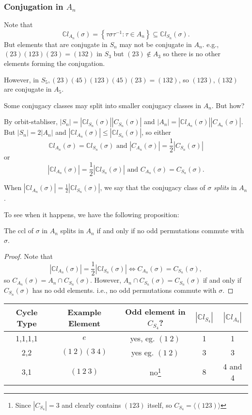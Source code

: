 \documentclass[a4paper]{article}
\begin{document}
\subsubsection{Conjugation in $A_n$}

Note that
\[
  \mathbb{C}l_{A_n}(\sigma)=\left\{ \tau \sigma\tau^{-1}:\tau\in A_n
  \right\} \subseteq \mathbb{C}l_{S_n}(\sigma)
.\]
But elements that are conjugate in $S_n$ may not be conjugate in
$A_n$. e.g., $ (23)(123)(23)=(132) $ in $S_3$ but $ (23)\notin A_3 $
so there is no other elements forming the conjugation.

However, in $S_5, (23)(45)(123)(45)(23)=(132)$, so $ (123),(132) $
are conjugate in $A_5$.

Some conjugacy classes may split into smaller conjugacy classes in
$A_n$. But how?

By orbit-stabliser, $
|S_n|=|\mathbb{C}l_{S_n}(\sigma)||C_{S_n}(\sigma)| $ and $
|A_n|=|\mathbb{C}l_{A_n}(\sigma)||C_{A_n}(\sigma)| $. But $
|S_n|=2|A_n| $ and $ |\mathbb{C}l_{A_n}(\sigma)|\le
|\mathbb{C}l_{S_n}(\sigma)| $, so either
\[
  \mathbb{C}l_{A_n}(\sigma)=\mathbb{C}l_{S_n}(\sigma) \text{ and }
  |C_{A_n}(\sigma)|=\frac{1}{2}|C_{S_n}(\sigma)|
\]
or
\[
  |\mathbb{C}l_{A_n}(\sigma)|=\frac{1}{2}
  |\mathbb{C}l_{S_n}(\sigma)|\text{ and } C_{A_n}(\sigma)=C_{S_n}(\sigma)
.\]
\begin{definition}
  When $|\mathbb{C}l_{A_n}(\sigma)|=\frac{1}{2}
  |\mathbb{C}l_{S_n}(\sigma)|$, we say that the conjugacy class of $
  \sigma $ \textit{splits} in $A_n$.
\end{definition}
To see when it happens, we have the following proposition:
\begin{proposition}\label{prop:5.28}
  The ccl of $ \sigma $ in $A_n$ splits in $A_n$ if and only if no
  odd permutations commute with $\sigma$.
\end{proposition}
\begin{proof}
  Note that
  \[
    |\mathbb{C}l_{A_n}(\sigma)|=\frac{1}{2}
    |\mathbb{C}l_{S_n}(\sigma)| \Longleftrightarrow
    C_{A_n}(\sigma)=C_{S_n}(\sigma)
  ,\]
  so $ C_{A_n}(\sigma)=A_n \cap C_{S_n}(\sigma) $. However, $ A_n
  \cap C_{S_n}(\sigma) =C_{S_n}(\sigma) $ if and only if
  $C_{S_n}(\sigma)$ has no odd elements. i.e., no odd permutations
  commute with $ \sigma $.
\end{proof}
\begin{example}
  \begin{center}
    \begin{tabular}{c|c|c|c|c}
      Cycle Type & Example Element & Odd element in $C_{S_4}$? &
      $|\mathbb{C}l_{S_4}|$ & $|\mathbb{C}l_{A_4}|$ \\
      \hline
      1,1,1,1 & $e$ & yes, eg. $(1\ 2)$ & 1 & 1\\
      2,2 & $(1\ 2)(3\ 4)$ & yes eg. $(1\ 2)$ & 3 & 3\\
      3,1 & $(1\ 2\ 3)$ & no\footnote{Since $ |C_{S_4}|=3 $ and
        clearly contains $(123)$ itself, so $ C_{S_4}=\langle (123)
      \rangle $} & 8 & 4 and 4\\
    \end{tabular}
  \end{center}
\end{example}
\end{document}
